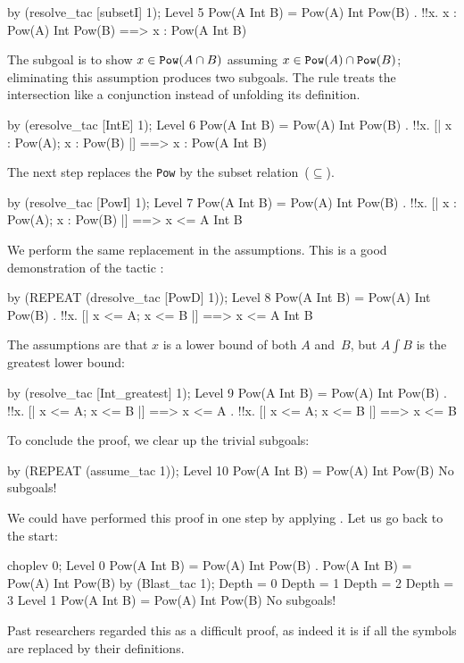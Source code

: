 \begin{ttbox}
by (resolve_tac [subsetI] 1);
{\out Level 5}
{\out Pow(A Int B) = Pow(A) Int Pow(B)}
{. !!x. x : Pow(A) Int Pow(B) ==> x : Pow(A Int B)}
\end{ttbox}
The subgoal is to show $x\in {\tt Pow}(A\cap B)$ assuming $x\in{\tt
Pow}(A)\cap {\tt Pow}(B)$; eliminating this assumption produces two
subgoals.  The rule  treats the intersection like a conjunction
instead of unfolding its definition.
\begin{ttbox}
by (eresolve_tac [IntE] 1);
{\out Level 6}
{\out Pow(A Int B) = Pow(A) Int Pow(B)}
{. !!x. [| x : Pow(A); x : Pow(B) |] ==> x : Pow(A Int B)}
\end{ttbox}
The next step replaces the \texttt{Pow} by the subset
relation~($\subseteq$).
\begin{ttbox}
by (resolve_tac [PowI] 1);
{\out Level 7}
{\out Pow(A Int B) = Pow(A) Int Pow(B)}
{. !!x. [| x : Pow(A); x : Pow(B) |] ==> x <= A Int B}
\end{ttbox}
We perform the same replacement in the assumptions.  This is a good
demonstration of the tactic :
\begin{ttbox}
by (REPEAT (dresolve_tac [PowD] 1));
{\out Level 8}
{\out Pow(A Int B) = Pow(A) Int Pow(B)}
{. !!x. [| x <= A; x <= B |] ==> x <= A Int B}
\end{ttbox}
The assumptions are that $x$ is a lower bound of both $A$ and~$B$, but
$A\int B$ is the greatest lower bound:
\begin{ttbox}
by (resolve_tac [Int_greatest] 1);
{\out Level 9}
{\out Pow(A Int B) = Pow(A) Int Pow(B)}
{. !!x. [| x <= A; x <= B |] ==> x <= A}
{. !!x. [| x <= A; x <= B |] ==> x <= B}
\end{ttbox}
To conclude the proof, we clear up the trivial subgoals:
\begin{ttbox}
by (REPEAT (assume_tac 1));
{\out Level 10}
{\out Pow(A Int B) = Pow(A) Int Pow(B)}
{\out No subgoals!}
\end{ttbox}
\medskip
We could have performed this proof in one step by applying
.  Let us
go back to the start:
\begin{ttbox}
choplev 0;
{\out Level 0}
{\out Pow(A Int B) = Pow(A) Int Pow(B)}
{. Pow(A Int B) = Pow(A) Int Pow(B)}
by (Blast_tac 1);
{\out Depth = 0}
{\out Depth = 1}
{\out Depth = 2}
{\out Depth = 3}
{\out Level 1}
{\out Pow(A Int B) = Pow(A) Int Pow(B)}
{\out No subgoals!}
\end{ttbox}
Past researchers regarded this as a difficult proof, as indeed it is if all
the symbols are replaced by their definitions.
\goodbreak

